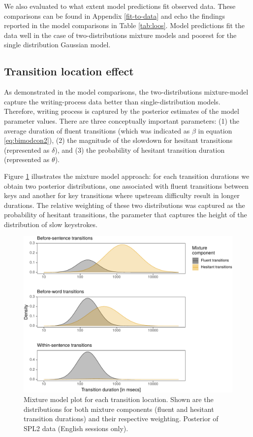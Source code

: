 \documentclass[
  english,
  man,floatsintext]{apa7}
\begin{document}
We also evaluated to what extent model predictions fit observed data. These comparisons can be found in Appendix \ref{fit-to-data} and echo the findings reported in the model comparisons in Table \ref{tab:loos}. Model predictions fit the data well in the case of two-distributions mixture models and poorest for the single distribution Gaussian model.

\hypertarget{transition-location-effect}{%
\subsection{Transition location effect}\label{transition-location-effect}}

As demonstrated in the model comparisons, the two-distributions mixture-model capture the writing-process data better than single-distribution models. Therefore, writing process is captured by the posterior estimates of the model parameter values. There are three conceptually important parameters: (1) the average duration of fluent transitions (which was indicated as \(\beta\) in equation \ref{eq:bimodcon2}), (2) the magnitude of the slowdown for hesitant transitions (represented as \(\delta\)), and (3) the probability of hesitant transition duration (represented as \(\theta\)).

Figure \ref{fig:mixmodel} illustrates the mixture model approach: for each transition durations we obtain two posterior distributions, one associated with fluent transitions between keys and another for key transitions where upstream difficulty result in longer durations. The relative weighting of these two distributions was captured as the probability of hesitant transitions, the parameter that captures the height of the distribution of slow keystrokes.

\begin{figure}

{\centering \includegraphics{manuscript_files/figure-latex/mixmodel-1} 

}

\caption{Mixture model plot for each transition location. Shown are the distributions for both mixture components (fluent and hesitant transition durations) and their respective weighting. Posterior of SPL2 data (English sessions only).}\label{fig:mixmodel}
\end{figure}
\end{document}
